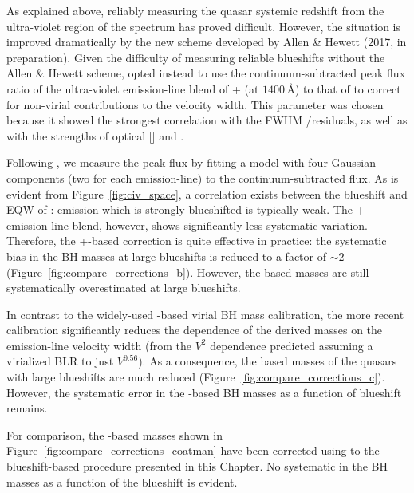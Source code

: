 As explained above, reliably measuring the quasar systemic redshift from the ultra-violet region of the spectrum has proved difficult. 
However, the situation is improved dramatically by the new scheme developed by Allen \& Hewett (2017, in preparation). 
Given the difficulty of measuring reliable  blueshifts without the Allen \& Hewett scheme, \citet{runnoe13} opted instead to use the continuum-subtracted peak flux ratio of the ultra-violet emission-line blend of + (at $1400$\,\AA) to that of  to correct for non-virial contributions to the  velocity width. 
This parameter was chosen because it showed the strongest correlation with the FWHM /\hb residuals, as well as with the strengths of optical [] and . 

Following \citet{runnoe13}, we measure the peak flux by fitting a model with four Gaussian components (two for each emission-line) to the continuum-subtracted flux.
As is evident from Figure~\ref{fig:civ_space}, a correlation exists between the blueshift and EQW of :  emission which is strongly blueshifted is typically weak. 
The + emission-line blend, however, shows significantly less systematic variation. 
Therefore, the +-based correction is quite effective in practice: the systematic bias in the  BH masses at large  blueshifts is reduced to a factor of $\sim2$ (Figure~\ref{fig:compare_corrections_b}).
However, the  based masses are still systematically overestimated at large  blueshifts. 

In contrast to the widely-used \citet{vestergaard06} -based virial BH mass calibration, the more recent \citet{park13} calibration significantly reduces the dependence of the derived masses on the emission-line velocity width (from the $V^2$ dependence predicted assuming a virialized BLR to just $V^{0.56}$).
As a consequence, the  based masses of the quasars with large  blueshifts are much reduced (Figure~\ref{fig:compare_corrections_c}).
However, the systematic error in the -based BH masses as a function of  blueshift remains. 

For comparison, the -based masses shown in Figure~\ref{fig:compare_corrections_coatman} have been corrected using to the  blueshift-based procedure presented in this Chapter. 
No systematic in the BH masses as a function of the  blueshift is evident. 

